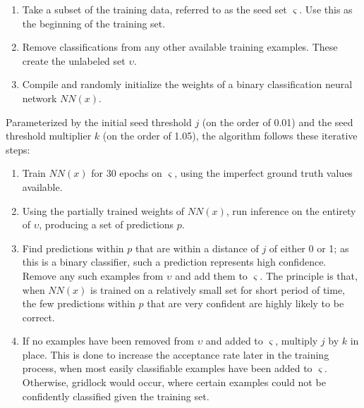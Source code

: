 \documentclass[10pt]{article}
\begin{document}
\begin{enumerate}
    \item Take a subset of the training data, referred to as the seed set $\varsigma$. Use this as the beginning of the training set.
    \item Remove classifications from any other available training examples. These create the unlabeled set $\upsilon$.
    \item Compile and randomly initialize the weights of a binary classification neural network $NN(x)$.
\end{enumerate}

Parameterized by the initial seed threshold $j$ (on the order of 0.01) and the seed threshold multiplier $k$ (on the order of 1.05), the algorithm follows these iterative steps:

\begin{enumerate}
    \item Train $NN(x)$ for 30 epochs on $\varsigma$, using the imperfect ground truth values available.
    \item Using the partially trained weights of $NN(x)$, run inference on the entirety of $\upsilon$, producing a set of predictions $p$.
    \item Find predictions within $p$ that are within a distance of $j$ of either 0 or 1; as this is a binary classifier, such a prediction represents high confidence. Remove any such examples from $\upsilon$ and add them to $\varsigma$. The principle is that, when $NN(x)$ is trained on a relatively small set for short period of time, the few predictions within $p$ that are very confident are highly likely to be correct.
    \item If no examples have been removed from $\upsilon$ and added to $\varsigma$, multiply $j$ by $k$ in place. This is done to increase the acceptance rate later in the training process, when most easily classifiable examples have been added to $\varsigma$. Otherwise, gridlock would occur, where certain examples could not be confidently classified given the training set.
\end{enumerate}

\printbibliography
\end{document}
